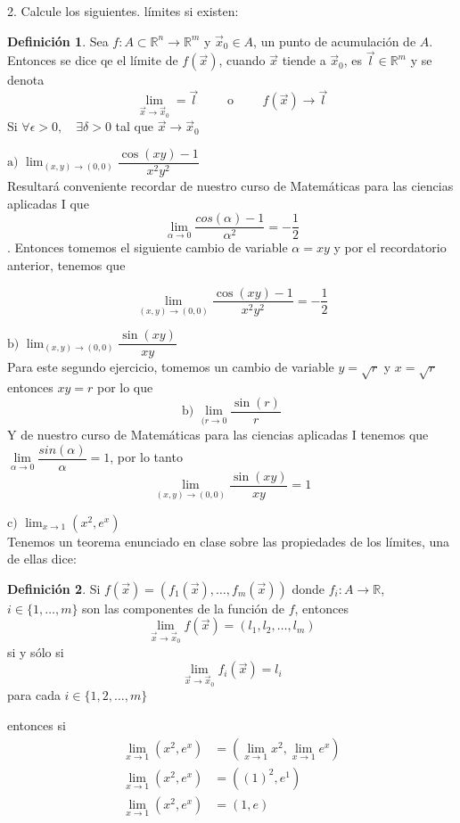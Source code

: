 \documentclass[letterpaper]{article}
\newcommand{\R}{\mathds{R}}
\renewcommand{\*}{\cdot}
\theoremstyle{definition}
\newtheorem{definition}{Definición}
\begin{document}
2.  Calcule los siguientes. límites si existen: 
\begin{definition}
	Sea $ f: A \subset \R^n \to \R^m $ y $ \vec{x}_0 \in A $, un punto de acumulación de $ A $. Entonces se dice qe el límite de $  f(\vec{x}) $, cuando $ \vec{x} $ tiende a $ \vec{x}_0 $, es $ \vec{\textit{l}} \in \R^m $ y se denota
	\[ \lim\limits_{\vec{x} \to \vec{x}_0} = \vec{\textit{l}} \qquad \text{ o } \qquad f(\vec{x}) \to \vec{\textit{l}} \]
	Si $ \forall \epsilon > 0, \quad \exists  \delta > 0 $ tal que $ \vec{x} \to \vec{x}_0 $
\end{definition}


\noindent$\text{a) }\displaystyle\lim_{(x,y) \to (0,0)} \dfrac{\cos(xy) - 1}{x^2y^2}$\\
Resultará conveniente recordar de nuestro curso de Matemáticas para las ciencias aplicadas I que $$ \lim\limits_{\alpha \to 0} \dfrac{cos(\alpha) - 1}{\alpha^2} = -\dfrac{1}{2} $$.  
Entonces tomemos el siguiente cambio de variable $ \alpha = xy $
y por el recordatorio anterior, tenemos que 
 
$$\displaystyle\lim_{(x,y) \to (0,0)} \dfrac{\cos(xy) - 1}{x^2y^2} = -\dfrac{1}{2}$$

\noindent$\text{b) }\displaystyle\lim_{(x,y) \to (0,0)} \dfrac{\sin(xy) }{xy}$\\
Para este segundo ejercicio, tomemos un cambio de variable $ y =\sqrt{r}  $ y $ x = \sqrt{r} $ entonces $ xy = r $ por lo que
$$\text{b) }\displaystyle\lim_{(r\to 0} \dfrac{\sin(r) }{r}$$
Y de nuestro curso de Matemáticas para las ciencias aplicadas I tenemos que $ \lim\limits_{\alpha \to 0} \dfrac{sin(\alpha)}{\alpha} = 1 $, por lo tanto
$$\displaystyle\lim_{(x,y) \to (0,0)} \dfrac{\sin(xy) }{xy} = 1$$

$\text{c) }\displaystyle\lim_{x \to 1} (x^2 , e^x) $\\[0.5cm]
Tenemos un teorema enunciado en clase sobre las propiedades de los límites, una de ellas dice:
\begin{definition}
	Si $ f(\vec{x}) = (f_1(\vec{x}), \dots, f_m(\vec{x})) $ donde $ f_i:A \to \R  $, $ i \in \{ 1, \dots, m \} $  son las componentes de la función de $ f $, entonces 
	\[ \lim\limits_{\vec{x} \to \vec{x}_0 } f(\vec{x}) = (l_1, l_2, \dots, l_m) \] si y sólo si\[ \lim\limits_{\vec{x} \to \vec{x}_0} f_i(\vec{x}) = l_i \] para cada $ i \in \{ 1, 2, \dots, m \} $
\end{definition}
entonces si
\begin{align*}
	\lim_{x \to 1} (x^2 , e^x) &=\left( \lim_{x \to 1} x^2, \lim_{x \to 1} e^x \right)\\
	\lim_{x \to 1} (x^2 , e^x) &=\left( (1)^2,  e^{1} \right)\\
	\lim_{x \to 1} (x^2 , e^x) &=\left( 1,  e \right)\\
\end{align*}
\end{document}

